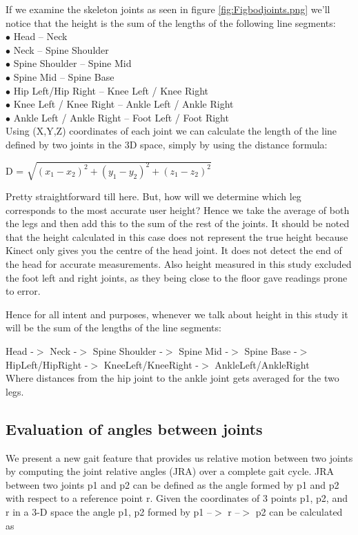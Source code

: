 \noindent If we examine the skeleton joints as seen in figure \ref{fig:Figbodjoints.png} we'll notice that the height is the sum of the lengths of the following line segments:\\
\noindent$\bullet$   Head – Neck\\
$\bullet$	Neck – Spine Shoulder\\
$\bullet$	Spine Shoulder – Spine Mid\\
$\bullet$	Spine Mid – Spine Base\\
$\bullet$	Hip Left/Hip Right – Knee Left / Knee Right\\
$\bullet$	Knee Left / Knee Right – Ankle Left / Ankle Right\\
$\bullet$	Ankle Left / Ankle Right – Foot Left / Foot Right\\

\noindent Using (X,Y,Z) coordinates of each joint we can calculate the length of the line defined by two joints in the 3D space, simply by using the distance formula:

 D = $\sqrt{(x_{1}-x_{2})^2+ (y_{1}-y_{2})^2+(z_{1}-z_{2})^2}$

\noindent Pretty straightforward till here. But, how will we determine which leg corresponds to the most accurate user height? Hence we take the average of both the legs and then add this to the sum of the rest of the joints.
It should be noted that the height calculated in this case does not represent the true height because Kinect only gives you the centre of the head joint. It does not detect the end of the head for accurate measurements. Also height measured in this study excluded the foot left and right joints, as they being close to the floor gave readings prone to error.

\noindent Hence for all intent and purposes, whenever we talk about height in this study it will be the sum of the lengths of the line segments:

\noindent Head -$>$ Neck -$>$ Spine Shoulder -$>$ Spine Mid -$>$ Spine Base -$>$ HipLeft/HipRight -$>$ KneeLeft/KneeRight -$>$ AnkleLeft/AnkleRight\\ 
Where distances from the hip joint to the ankle joint gets averaged for the two legs.
\newpage

\subsection{ Evaluation of angles between joints} \label{ Evaluation of angles between joints}
We present a new gait feature that provides us relative motion between two joints by computing the joint relative angles (JRA) over a complete gait cycle. JRA between two joints p1 and p2 can be defined as the angle formed by p1 and p2 with respect to a reference point r. Given the coordinates of 3 points p1, p2, and r in a 3-D space the angle p1, p2 formed by p1 --$>$ r --$>$ p2 can be calculated as

